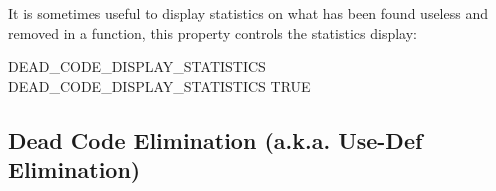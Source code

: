 \documentclass[a4paper]{report}
\begin{document}
It is sometimes useful to display statistics on what has been found
useless and removed in a function, this property controls the
statistics display:
\begin{PipsProp}{DEAD_CODE_DISPLAY_STATISTICS}
DEAD_CODE_DISPLAY_STATISTICS TRUE
\end{PipsProp}


\subsection{Dead Code Elimination (a.k.a. Use-Def Elimination)}
\label{sec:use-def-elimination}
\end{document}
